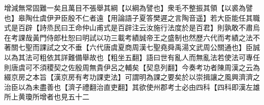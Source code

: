 增減無常固難一矣且萬目不張舉其綱【以綱為譬也】衆毛不整振其領【以裘為譬也】皋陶仕虞伊尹臣殷不仁者遠【用論語子夏答樊遲之言陶音遥】若大臣能任其職式是百辟【詩烝民曰王命仲山甫式是百辟注云汝施行法度於是百君】則孰敢不肅烏在考課哉黃門侍郎杜恕曰明試以功三載考績誠帝王之盛制也然歷六代而考績之法不著關七聖而課試之文不垂【六代唐虞夏商周漢七聖堯舜禹湯文武周公關通也】臣誠以為其法可粗依其詳難備舉故也【粗坐五翻】語曰世有亂人而無亂法若使法可專任則唐虞可不須稷契之佐殷周無貴伊呂之輔矣【契息列翻】今奏考功者陳周漢之云為綴京房之本旨【漢京房有考功課吏法】可謂明為課之要矣於以崇揖讓之風興濟濟之治臣以為未盡善也【濟子禮翻治直吏翻】其欲使州郡考士必由四科【四科即漢左雄所上黄瓊所增者也見五十二